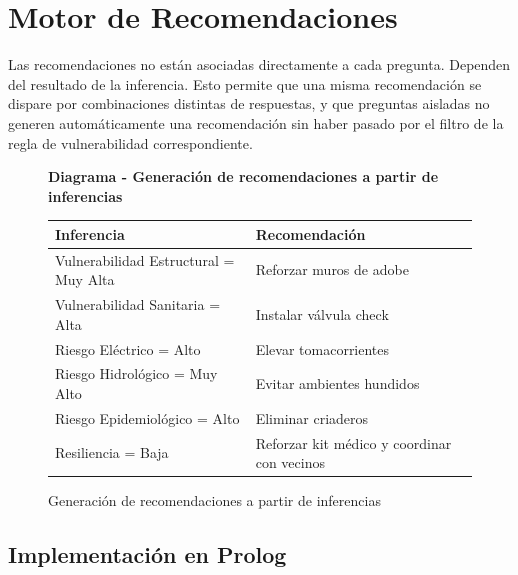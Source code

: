 \documentclass[12pt, letterpaper]{article}
\newcommand{\diagrambox}[3]{%
  \begin{figure}[H]
    \centering
    \begin{tcolorbox}[colback=white!90!blue, colframe=blue!60!black, width=\linewidth, arc=3mm, auto outer arc]
      \centering
      \textbf{Diagrama - #2} %
      \vspace{0.5cm}
      \parbox{0.95\linewidth}{\centering #3}
    \end{tcolorbox}
    \caption{#2}
    \label{fig:#1}
  \end{figure}
}
\begin{document}
\section{Motor de Recomendaciones}

Las recomendaciones no están asociadas directamente a cada pregunta. Dependen del resultado de la inferencia. Esto permite que una misma recomendación se dispare por combinaciones distintas de respuestas, y que preguntas aisladas no generen automáticamente una recomendación sin haber pasado por el filtro de la regla de vulnerabilidad correspondiente.

\diagrambox{generacion_recomendaciones}{Generación de recomendaciones a partir de inferencias}{
  \begin{tabular}{p{5cm} p{9cm}}
    \textbf{Inferencia} & \textbf{Recomendación} \\
    \hline
    Vulnerabilidad Estructural = Muy Alta & Reforzar muros de adobe \\
    Vulnerabilidad Sanitaria = Alta & Instalar válvula check \\
    Riesgo Eléctrico = Alto & Elevar tomacorrientes \\
    Riesgo Hidrológico = Muy Alto & Evitar ambientes hundidos \\
    Riesgo Epidemiológico = Alto & Eliminar criaderos \\
    Resiliencia = Baja & Reforzar kit médico y coordinar con vecinos
  \end{tabular}
}

\subsection{Implementación en Prolog}
\end{document}
